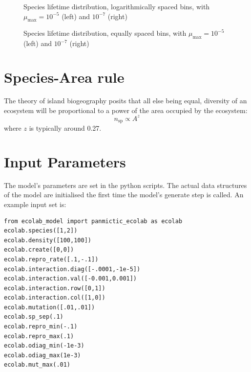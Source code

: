 \documentclass{article}
\begin{document}
\begin{figure}\label{lifetime-logbin-mu=1e-5}
  {\tiny
  \hspace*{-5ex}
  \hfill
  
  }
  \caption{Species lifetime distribution, logarithmically spaced
    bins, with $\mu_\mathrm{max}=10^{-5}$ (left) and $10^{-7}$ (right)}
\end{figure}

\begin{figure}\label{lifetime-linbin-mu=1e-5}
  {\tiny
  \hfill
  
}

  \caption{Species lifetime distribution, equally spaced bins, with
    $\mu_\mathrm{max}=10^{-5}$ (left) and $10^{-7}$ (right)}
\end{figure}

\section{Species-Area rule}

The theory of island biogeography\cite{MacArthur-Wilson67} posits that
all else being equal, diversity of an ecosystem will be proportional
to a power of the area occupied by the ecosystem:
\begin{equation}
  n_\mathrm{sp}\propto A^z
\end{equation}
where $z$ is typically around 0.27.\cite{?}



\section{Input Parameters}\label{input parameters}

The model's parameters are set in the python scripts.
The actual data structures of the model are initialised the first time
the model's generate step is called. An example input set is:
\begin{verbatim}
from ecolab_model import panmictic_ecolab as ecolab
ecolab.species([1,2])
ecolab.density([100,100]) 
ecolab.create([0,0])
ecolab.repro_rate([.1,-.1])
ecolab.interaction.diag([-.0001,-1e-5])
ecolab.interaction.val([-0.001,0.001])
ecolab.interaction.row([0,1])
ecolab.interaction.col([1,0])
ecolab.mutation([.01,.01])
ecolab.sp_sep(.1)
ecolab.repro_min(-.1)
ecolab.repro_max(.1)
ecolab.odiag_min(-1e-3)
ecolab.odiag_max(1e-3)
ecolab.mut_max(.01)
\end{verbatim}
\end{document}
